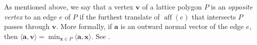 \documentclass[11pt]{article}
\newcommand{\ba}{\mathbf{a}}
\newcommand{\bv}{\mathbf{v}}
\newcommand{\bx}{\mathbf{x}}
\newcommand{\R}{\mathbb{R}}
\DeclareMathOperator{\aff}{aff}
\begin{document}








As mentioned above, we say that a vertex $\bv$ of a lattice polygon $P$ is an \emph{opposite vertex} to an edge $e$ of $P$ if the furthest translate of $\aff(e)$ that intersects $P$ passes through $\bv$. More formally, if $\ba$ is an outward normal vector of the edge $e$, then $\langle \ba, \bv \rangle = \min_{\bx \in P} \langle \ba,\bx \rangle$. See .
\end{document}
